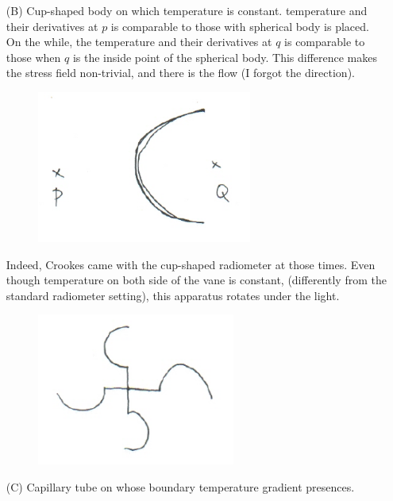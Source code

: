 \documentclass[a4paper,12pt]{article}
\begin{document}
\begin{enumerate}
 \item[(B)] Cup-shaped body on which temperature is constant. temperature and their derivatives at $p$ is comparable to those with spherical body is placed. On the while, the temperature and their derivatives at $q$ is comparable to those when $q$ is the inside point of the spherical body. This difference makes the stress field non-trivial, and there is the flow (I forgot the direction). 
 \begin{figure}[ht]
  \centering
  \includegraphics[height=5cm]{Maxwell_B.png}
 \end{figure} 
 Indeed, Crookes came with the cup-shaped radiometer at those times. Even though temperature on both side of the vane is constant, (differently from the standard radiometer setting), this apparatus rotates under the light.
 \begin{figure}[ht]
  \centering
  \includegraphics[height=5cm]{cup_radiometer.png}
 \end{figure} 
 
 \item[(C)] Capillary tube on whose boundary temperature gradient presences.


\end{enumerate}
\end{document}
